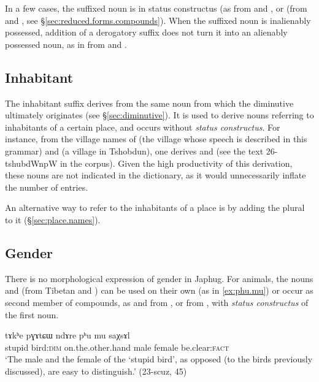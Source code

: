  In a few cases, the suffixed noun is in status constructus (as  from  and , or  (from  and , see §\ref{sec:reduced.forms.compounds}). When the suffixed noun is  inalienably possessed, addition of a derogatory suffix does not turn it into an alienably possessed noun, as in  from  and .

\subsection{Inhabitant} \label{ex:inhabitant.pW}
The inhabitant suffix  derives from the same noun  from which the diminutive  ultimately originates (see §\ref{sec:diminutive}). It is used to derive nouns referring to inhabitants of a certain place, and occurs without \textit{status constructus}. For instance, from the village names of  (the village whose speech is described in this grammar) and  (a village in Tshobdun), one derives  and  (see the text 26-tshubdWnpW in the corpus). Given the high productivity of this derivation, these nouns are not indicated in the dictionary, as it would unnecessarily inflate the number of entries.

An alternative way to refer to the inhabitants of a place is by adding the plural  to it  (§\ref{sec:place.names}).

\subsection{Gender} \label{sec:gender}
There is no morphological expression of gender in Japhug. For animals, the nouns  and  (from Tibetan  and ) can be used on their own (as in \ref{ex:phu.mu}) or occur as second member of compounds, as  and  from , or  from , with \textit{status constructus} of the first noun.

\begin{exe}
\ex \label{ex:phu.mu}
\gll tɤkʰe pɣɤtɕɯ ndɤre pʰu mu saχsɤl \\
stupid bird:\textsc{dim} on.the.other.hand male female be.clear:\textsc{fact} \\
\glt `The male and the female of the `stupid bird', as opposed (to the birds previously discussed), are easy to distinguish.' (23-scuz, 45)
\end{exe}

